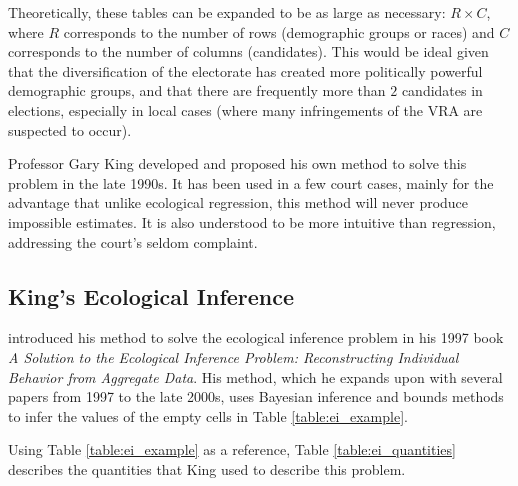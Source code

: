 Theoretically, these tables can be expanded to be as large as necessary: $R \times C$, where $R$ corresponds to the number of rows (demographic groups or races) and $C$ corresponds to the number of columns (candidates). This would be ideal given that the diversification of the electorate has created more politically powerful demographic groups, and that there are frequently more than $2$ candidates in elections, especially in local cases (where many infringements of the VRA are suspected to occur).

Professor Gary King developed and proposed his own method to solve this problem in the late 1990s. It has been used in a few court cases, mainly for the advantage that unlike ecological regression, this method will never produce impossible estimates. It is also understood to be more intuitive than regression, addressing the court's seldom complaint.

\subsection{King's Ecological Inference}

 introduced his method to solve the ecological inference problem in his 1997 book \textit{A Solution to the Ecological Inference Problem: Reconstructing Individual Behavior from Aggregate Data}\cite{king1997}. His method, which he expands upon with several papers from 1997 to the late 2000s, uses Bayesian inference and bounds methods to infer the values of the empty cells in Table \ref{table:ei_example}.

Using Table \ref{table:ei_example} as a reference, Table \ref{table:ei_quantities} describes the quantities that King used to describe this problem\cite{king1999}.

